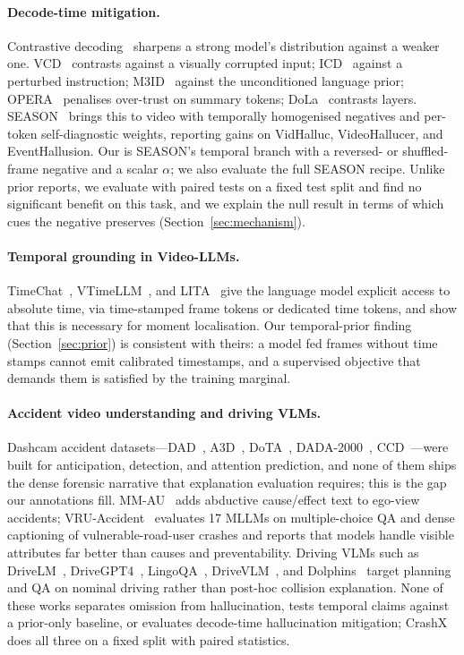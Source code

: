 \paragraph{Decode-time mitigation.}
Contrastive decoding~\cite{li2023cd} sharpens a strong model's distribution against a weaker one.
VCD~\cite{vcd} contrasts against a visually corrupted input; ICD~\cite{icd} against a perturbed instruction; M3ID~\cite{m3id} against the unconditioned language prior; OPERA~\cite{opera} penalises over-trust on summary tokens; DoLa~\cite{dola} contrasts layers.
SEASON~\cite{season2025} brings this to video with temporally homogenised negatives and per-token self-diagnostic weights, reporting gains on VidHalluc, VideoHallucer, and EventHallusion.
Our \tcd{} is SEASON's temporal branch with a reversed- or shuffled-frame negative and a scalar $\alpha$; we also evaluate the full SEASON recipe.
Unlike prior reports, we evaluate with paired tests on a fixed test split and find no significant benefit on this task, and we explain the null result in terms of which cues the negative preserves (Section~\ref{sec:mechanism}).

\paragraph{Temporal grounding in Video-LLMs.}
TimeChat~\cite{timechat}, VTimeLLM~\cite{vtimellm}, and LITA~\cite{lita} give the language model explicit access to absolute time, via time-stamped frame tokens or dedicated time tokens, and show that this is necessary for moment localisation.
Our temporal-prior finding (Section~\ref{sec:prior}) is consistent with theirs: a model fed frames without time stamps cannot emit calibrated timestamps, and a supervised objective that demands them is satisfied by the training marginal.

\paragraph{Accident video understanding and driving VLMs.}
Dashcam accident datasets---DAD~\cite{chan2016dad}, A3D~\cite{yao2019a3d}, DoTA~\cite{yao2022dota}, DADA-2000~\cite{fang2021dada}, CCD~\cite{bao2020nondeterministic}---were built for anticipation, detection, and attention prediction, and none of them ships the dense forensic narrative that explanation evaluation requires; this is the gap our \dataset{} annotations fill.
MM-AU~\cite{fang2024mmau} adds abductive cause/effect text to ego-view accidents; VRU-Accident~\cite{vruaccident} evaluates 17 MLLMs on multiple-choice QA and dense captioning of vulnerable-road-user crashes and reports that models handle visible attributes far better than causes and preventability.
Driving VLMs such as DriveLM~\cite{drivelm}, DriveGPT4~\cite{drivegpt4}, LingoQA~\cite{lingoqa}, DriveVLM~\cite{drivevlm}, and Dolphins~\cite{dolphins} target planning and QA on nominal driving rather than post-hoc collision explanation.
None of these works separates omission from hallucination, tests temporal claims against a prior-only baseline, or evaluates decode-time hallucination mitigation; CrashX does all three on a fixed split with paired statistics.

